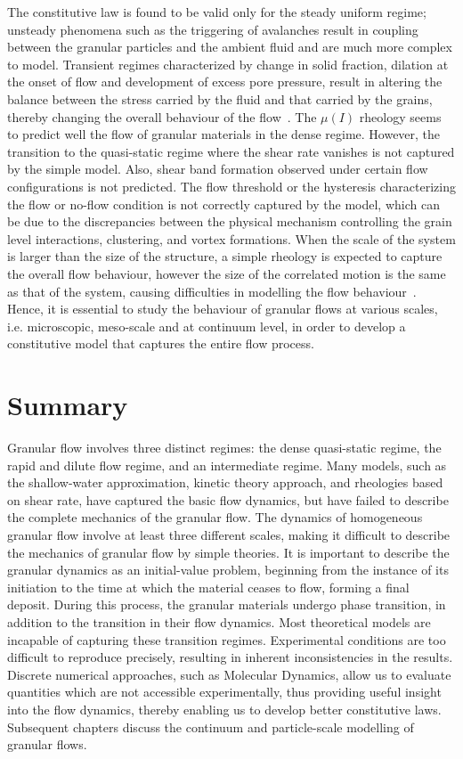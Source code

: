 The constitutive law is found to be valid only for the steady uniform regime; 
unsteady phenomena such as the triggering of avalanches result in coupling 
between the granular particles and the ambient fluid and are much more complex 
to model. Transient regimes characterized by change in solid fraction, dilation 
at the onset of flow and development of excess pore pressure, result in 
altering the balance between the stress carried by the fluid and that carried 
by the grains, thereby changing the overall behaviour of the 
flow~\citep{Denlinger2001}. The $\mu (I)$ rheology seems to predict well the 
flow of granular materials in the dense regime. However, the transition to the 
quasi-static regime where the shear rate vanishes is not captured by the simple 
model. Also, shear band formation observed under certain flow configurations is 
not predicted. The flow threshold or the hysteresis characterizing the flow or 
no-flow condition is not correctly captured by the model, which can be due to 
the discrepancies between the physical mechanism controlling the grain level 
interactions, clustering, and vortex formations. When the scale of the system 
is larger than the size of the structure, a simple rheology is expected to 
capture the overall flow behaviour, however the size of the correlated motion 
is the same as that of the system, causing difficulties in modelling the flow 
behaviour~\citep{Pouliquen2005}. Hence, it is essential to study the behaviour 
of granular flows at various scales, i.e. microscopic, meso-scale and at 
continuum level, in order to develop a constitutive model that captures the 
entire flow process.

\section{Summary}
Granular flow involves three distinct regimes: the dense quasi-static regime, 
the rapid and dilute flow regime, and an intermediate regime. Many models, such 
as the shallow-water approximation, kinetic theory approach, and rheologies 
based on shear rate, have captured the basic flow dynamics, but have failed to 
describe the complete mechanics of the granular flow. The dynamics of 
homogeneous granular flow involve at least three different scales, making it 
difficult to describe the mechanics of granular flow by simple theories. It is 
important to describe the granular dynamics as an initial-value problem, 
beginning from the instance of its initiation to the time at which the material 
ceases to flow, forming a final deposit. During this process, the granular 
materials undergo phase transition, in addition to the transition in their flow 
dynamics. Most theoretical models are incapable of capturing these transition 
regimes. Experimental conditions are too difficult to reproduce precisely, 
resulting in inherent inconsistencies in the results. Discrete numerical 
approaches, such as Molecular Dynamics, allow us to evaluate quantities which 
are not accessible experimentally, thus providing useful insight into the flow 
dynamics, thereby enabling us to develop better constitutive laws. Subsequent 
chapters discuss the continuum and particle-scale modelling of granular flows.
